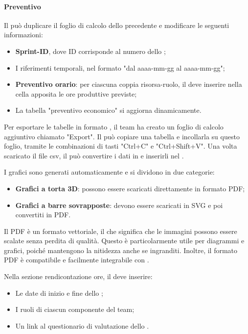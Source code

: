 \paragraph*{Preventivo}
Il \Responsabile{} può duplicare il foglio di calcolo dello  precedente e modificare le seguenti informazioni:
\begin{itemize}
  \item \textbf{Sprint-ID}, dove ID corrisponde al numero dello ;
  \item I riferimenti temporali, nel formato "dal aaaa-mm-gg al aaaa-mm-gg";
  \item \textbf{Preventivo orario}: per ciascuna coppia risorsa-ruolo, il \Responsabile{} deve inserire nella cella apposita le ore produttive previste;
  \item La tabella "preventivo economico" si aggiorna dinamicamente.
\end{itemize}
\par Per esportare le tabelle in formato , il team ha creato un foglio di calcolo aggiuntivo chiamato "Export". Il \Responsabile{} può copiare una tabella e incollarla su questo foglio, tramite le combinazioni di tasti "Ctrl+C" e "Ctrl+Shift+V". Una volta scaricato il file csv, il \Responsabile{} può convertire i dati in  e inserirli nel \PdP.
\par I grafici sono generati automaticamente e si dividono in due categorie:
\begin{itemize}
  \item \textbf{Grafici a torta 3D}: possono essere scaricati direttamente in formato PDF;
  \item \textbf{Grafici a barre sovrapposte}: devono essere scaricati in SVG e poi convertiti in PDF.
\end{itemize}
\par Il PDF è un formato vettoriale, il che significa che le immagini possono essere scalate senza perdita di qualità. Questo è particolarmente utile per diagrammi e grafici, poiché mantengono la nitidezza anche se ingranditi. Inoltre, il formato PDF è compatibile e facilmente integrabile con .
\par Nella sezione rendicontazione ore, il \Responsabile{} deve inserire:
\begin{itemize}
  \item Le date di inizio e fine dello ;
  \item I ruoli di ciascun componente del team;
  \item Un link al questionario di valutazione dello .
\end{itemize}

